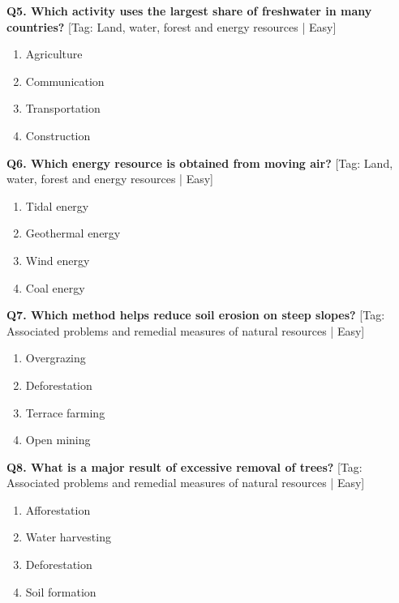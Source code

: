 \noindent\textbf{Q5. Which activity uses the largest share of freshwater in many countries?} \hfill [Tag: Land, water, forest and energy resources | Easy]
\begin{enumerate}[label=(\alph*),topsep=2pt,itemsep=1pt,partopsep=0pt,parsep=0pt]
    \item {Agriculture}
    \item {Communication}
    \item {Transportation}
    \item {Construction}
\end{enumerate}
\vspace{2mm}

\noindent\textbf{Q6. Which energy resource is obtained from moving air?} \hfill [Tag: Land, water, forest and energy resources | Easy]
\begin{enumerate}[label=(\alph*),topsep=2pt,itemsep=1pt,partopsep=0pt,parsep=0pt]
    \item {Tidal energy}
    \item {Geothermal energy}
    \item {Wind energy}
    \item {Coal energy}
\end{enumerate}
\vspace{2mm}

\noindent\textbf{Q7. Which method helps reduce soil erosion on steep slopes?} \hfill [Tag: Associated problems and remedial measures of natural resources | Easy]
\begin{enumerate}[label=(\alph*),topsep=2pt,itemsep=1pt,partopsep=0pt,parsep=0pt]
    \item {Overgrazing}
    \item {Deforestation}
    \item {Terrace farming}
    \item {Open mining}
\end{enumerate}
\vspace{2mm}

\noindent\textbf{Q8. What is a major result of excessive removal of trees?} \hfill [Tag: Associated problems and remedial measures of natural resources | Easy]
\begin{enumerate}[label=(\alph*),topsep=2pt,itemsep=1pt,partopsep=0pt,parsep=0pt]
    \item {Afforestation}
    \item {Water harvesting}
    \item {Deforestation}
    \item {Soil formation}
\end{enumerate}
\vspace{2mm}

